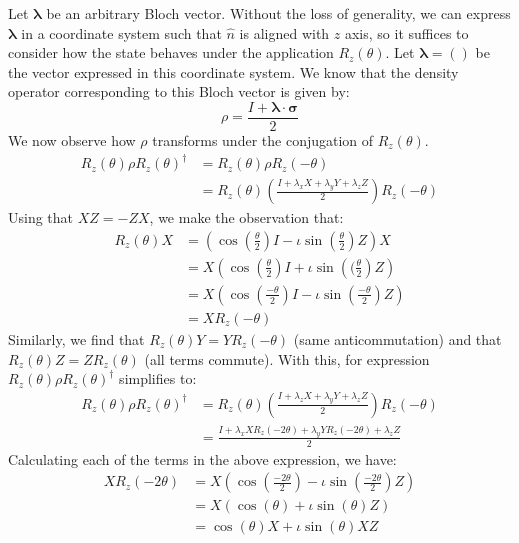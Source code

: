 \begin{example}
    Let $\mathbf{\lambda}$ be an arbitrary Bloch vector. Without the loss of generality, we can express $\mathbf{\lambda}$ in a coordinate system such that $\hat{n}$ is aligned with $z$ axis, so it suffices to consider how the state behaves under the application $R_z(\theta)$. Let $\mathbf{\lambda}=()$ be the vector expressed in this coordinate system. We know that the density operator corresponding to this Bloch vector is given by:
    \[
    \rho=\frac{I+\mathbf{\lambda} \cdot \mathbf{\sigma}}{2}
    \]
    We now observe how $\rho$ transforms under the conjugation of $R_z(\theta)$.
    \begin{align*}
        R_z(\theta)\rho R_z(\theta)^{\dagger} &=R_z(\theta)\rho R_z(-\theta)\\
        &=R_z(\theta)\left(\frac{I+\lambda_xX+\lambda_yY+\lambda_zZ}{2}\right)R_z(-\theta)
    \end{align*}
    Using that $XZ=-ZX$, we make the observation that:
    \begin{align*}
        R_z(\theta)X&=\left(\cos \left(\frac{\theta}{2}\right)I-\iota \sin\left(\frac{\theta}{2}\right)Z \right) X\\
        &=X\left(\cos \left(\frac{\theta}{2}\right)I+\iota \sin\left((\frac{\theta}{2}\right)Z\right)\\
        &=X\left(\cos\left(\frac{-\theta}{2}\right)I-\iota \sin\left(\frac{-\theta}{2}\right)Z\right)\\
        &=XR_z(-\theta)
    \end{align*}
    Similarly, we find that $R_z(\theta)Y=YR_z(-\theta)$ (same anticommutation) and that $R_z(\theta)Z=ZR_z(\theta)$ (all terms commute). With this, for expression $R_z(\theta)\rho R_z(\theta)^{\dagger}$ simplifies to:
    \begin{align*}
        R_z(\theta)\rho R_z(\theta)^{\dagger}&=R_z(\theta)\left(\frac{I+\lambda_zX+\lambda_yY+\lambda_zZ}{2}\right) R_z(-\theta)\\
        &= \frac{I+\lambda_xXR_z(-2\theta)+\lambda_yYR_z(-2\theta)+\lambda_zZ}{2}
    \end{align*}
    Calculating each of the terms in the above expression, we have:
    \begin{align*}
        XR_z(-2\theta)&=X\left(\cos\left(\frac{-2\theta}{2}\right)-\iota \sin\left(\frac{-2\theta}{2}\right) Z\right)\\
        &=X(\cos(\theta)+\iota \sin(\theta)Z)\\
        &=\cos(\theta)X+\iota \sin(\theta)XZ\\

\end{align*}
\end{example}
